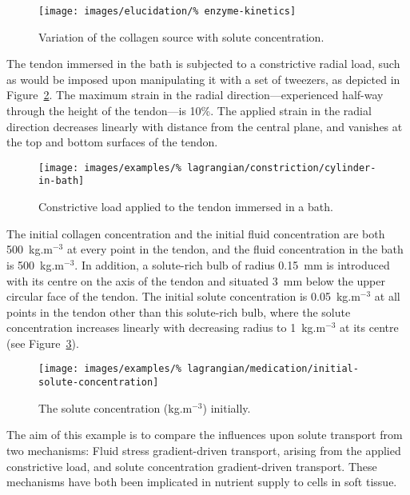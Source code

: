 \begin{figure}[!hpt]
  \centering
  \texttt{[image: images/elucidation/\%
    enzyme-kinetics]}
  \caption{Variation of the collagen source with solute
    concentration.}
  \label{eg3menten}
\end{figure}

The tendon immersed in the bath is subjected to a constrictive radial
load, such as would be imposed upon manipulating it with a set of
tweezers, as depicted in Figure~\ref{constrictload}. The maximum
strain in the radial direction---experienced half-way through the
height of the tendon---is 10\%. The applied strain in the radial
direction decreases linearly with distance from the central plane, and
vanishes at the top and bottom surfaces of the tendon.

\begin{figure}[!t]
  \centering
  \texttt{[image: images/examples/\%
    lagrangian/constriction/cylinder-in-bath]}
  \caption{Constrictive load applied to the tendon immersed in a
    bath.}
  \label{constrictload}
\end{figure}

The initial collagen concentration and the initial fluid concentration
are both 500~kg.m$^{-3}$ at every point in the tendon, and the fluid
concentration in the bath is 500~kg.m$^{-3}$. In addition, a
solute-rich bulb of radius 0.15~mm is introduced with its centre on
the axis of the tendon and situated 3~mm below the upper circular face
of the tendon. The initial solute concentration is 0.05~kg.m$^{-3}$ at
all points in the tendon other than this solute-rich bulb, where the
solute concentration increases linearly with decreasing radius to
1~kg.m$^{-3}$ at its centre (see Figure~\ref{eg3ini}).

\begin{figure}[!hpt]
  \centering
  \texttt{[image: images/examples/\%
    lagrangian/medication/initial-solute-concentration]}
  \caption{The solute concentration (kg.m$^{-3}$) initially.}
  \label{eg3ini}
\end{figure}

The aim of this example is to compare the influences upon solute
transport from two mechanisms: Fluid stress gradient-driven transport,
arising from the applied constrictive load, and solute concentration
gradient-driven transport. These mechanisms have both been implicated
in nutrient supply to cells in soft tissue.

